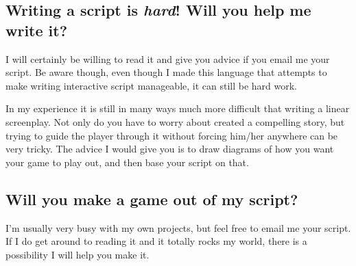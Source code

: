 \subsection{Writing a script is \emph{hard}!  Will you help me write it?}
I will certainly be willing to read it and give you advice if you email me your script.  Be aware though, even though I made this language that attempts to make writing interactive script manageable, it can still be hard work.  

In my experience it is still in many ways much more difficult that writing a linear screenplay.  Not only do you have to worry about created a compelling story, but trying to guide the player through it without forcing him/her anywhere can be very tricky.  The advice I would give you is to draw diagrams of how you want your game to play out, and then base your script on that.  


\subsection{Will you make a game out of my script?}
I'm usually very busy with my own projects, but feel free to email me your script.  If I do get around to reading it and it totally rocks my world, there is a possibility I will help you make it.  

